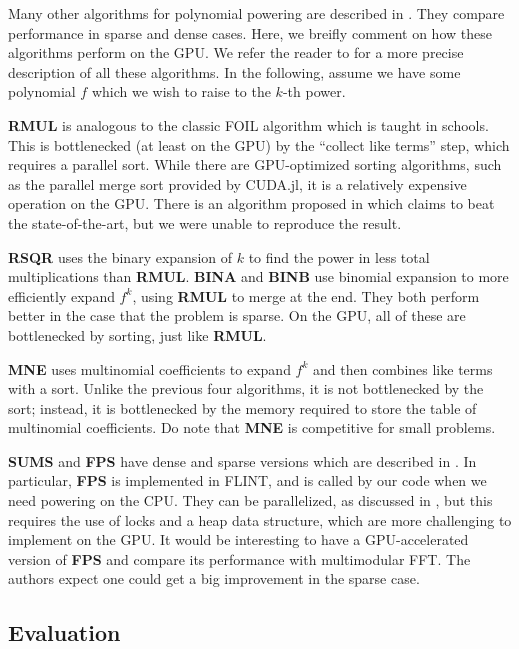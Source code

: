 Many other algorithms 
for polynomial powering
are described in \cite{monagan-2012-sparse-powering}. 
They compare performance in sparse and dense cases. 
Here, we breifly comment on how these algorithms perform on the GPU.
We refer the reader to \cite{monagan-2012-sparse-powering}
for a more precise description of all these algorithms.
In the following, assume we have some polynomial \(f\) which we wish 
to raise to the \(k\)-th power.

\textbf{RMUL} is analogous to the classic FOIL algorithm which is taught in schools. 
This is bottlenecked (at least on the GPU) by the ``collect like terms'' step, 
which requires a parallel sort.
While there are GPU-optimized sorting algorithms, such as the parallel merge sort
provided by CUDA.jl, it is a relatively expensive operation on the GPU.
There is an algorithm proposed in \cite{gupta-2023-gpu-sort}
which claims to beat the state-of-the-art, but we were unable to reproduce the result.

\textbf{RSQR} uses the binary expansion of \(k\) to find the power in less
total multiplications than \textbf{RMUL}.
\textbf{BINA} and \textbf{BINB} use binomial expansion to more efficiently 
expand \(f^{k}\), using \textbf{RMUL} to merge at the end.
They both perform better in the case that the problem is sparse.
On the GPU, all of these are bottlenecked by sorting, just like
\textbf{RMUL}.

\textbf{MNE} uses multinomial coefficients to expand \(f^{k}\) 
and then combines like terms with a sort. 
Unlike the previous four algorithms, it is not bottlenecked by the sort;
instead, it is bottlenecked by the memory required to store the table of
multinomial coefficients. Do note that \textbf{MNE} is 
competitive for small problems.

\textbf{SUMS} and \textbf{FPS} have dense and sparse versions which are described in 
\cite{monagan-2012-sparse-powering}.
In particular, \textbf{FPS} is implemented in FLINT, and is called by our
code when we need powering on the CPU.
They can be parallelized, as discussed in \cite{monagan-2012-sparse-powering},
but this requires the use of locks and a heap data structure,
which are more challenging to implement on the GPU.
It would be interesting to have a GPU-accelerated version of
\textbf{FPS} and compare its performance with 
multimodular FFT.
The authors expect one could get a big improvement in the sparse case.

\subsection{Evaluation}

